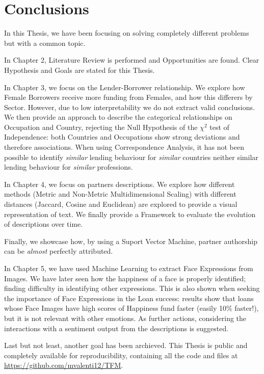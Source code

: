 
\chapter{Conclusions} %

\label{Chapter6} 

In this Thesis, we have been focusing on solving completely different problems but with a common topic.\par

In Chapter 2, Literature Review is performed and Opportunities are found. Clear Hypothesis and Goals are stated for this Thesis.\par

In Chapter 3, we focus on the Lender-Borrower relationship. We explore how Female Borrowers receive more funding from Females, and how this differers by Sector. However, due to low interpretability we do not extract valid conclusions. We then provide an approach to describe the categorical relationships on Occupation and Country, rejecting the Null Hypothesis of the $\chi^2$ test of Independence: both Countries and Occupations show strong deviations and therefore associations. When using Correspondence Analysis, it has not been possible to identify \textit{similar} lending behaviour for \textit{similar} countries neither similar lending behaviour for \textit{similar} professions.\par

In Chapter 4, we focus on partners descriptions. We explore how different methods (Metric and Non-Metric Multidimensional Scaling) with different distances (Jaccard, Cosine and Euclidean) are explored to provide a visual representation of text. We finally provide a Framework to evaluate the evolution of descriptions over time. \par
Finally, we showcase how, by using a Suport Vector Machine, partner authorship can be \textit{almost} perfectly attributed. \par
In Chapter 5, we have used Machine Learning to extract Face Expressions from Images. We have later seen how the happiness of a face is properly identified; finding difficulty in identifying other expressions. This is also shown when seeking the importance of Face Expressions in the Loan success: results show that loans whose Face Images have high scores of Happiness fund faster (easily 10\% faster!), but it is not relevant with other emotions. As further actions, considering the interactions with a sentiment output from the descriptions is suggested. \par

Last but not least, another goal has been archieved. This Thesis is public and completely available for reproducibility, containing all the code and files at \url{https://github.com/mvalenti12/TFM}. 